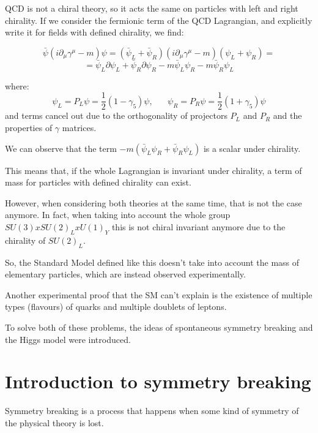 QCD is not a chiral theory, so it acts the same on particles with left and right chirality. 
If we consider the fermionic term of the QCD Lagrangian, and explicitly write it for fields with defined chirality, we find:

\begin{equation}
    \bar{\psi} (i\partial_{\mu}\gamma^{\mu}  - m ) \psi =  (\bar{\psi}_L + \bar{\psi}_R) (i\partial_{\mu}\gamma^{\mu}  - m ) (\psi_L + \psi_R) =
\end{equation}
\begin{equation*}
    = \bar{\psi}_L\partial\psi_L + \bar{\psi}_R\partial\psi_R - m\bar{\psi}_L\psi_R - m\bar{\psi}_R\psi_L
\end{equation*}

where:
\begin{equation*}
    \psi_L = P_L \psi = \frac{1}{2}(1- \gamma_5)\psi, \hspace{20pt} \psi_R = P_R\psi = \frac{1}{2}(1+ \gamma_5)\psi
\end{equation*}
and terms cancel out due to the orthogonality of projectors $P_L$ and $P_R$ and the properties of $\gamma$ matrices.

We can observe that the term $ - m(\bar{\psi}_L\psi_R + \bar{\psi}_R\psi_L)$ is a scalar under chirality.

This means that, if the whole Lagrangian is invariant under chirality, a term of mass for particles with defined chirality can exist.

However, when considering both theories at the same time, that is not the case anymore. In fact, when taking into account the whole group $SU(3)xSU(2)_LxU(1)_Y$ this is not chiral invariant anymore due to the chirality of $SU(2)_L$. 

So, the Standard Model defined like this doesn't take into account the mass of elementary particles, which are instead observed experimentally.

Another experimental proof that the SM can't explain is the existence of multiple types (flavours) of quarks and multiple doublets of leptons.

To solve both of these problems, the ideas of spontaneous symmetry breaking and the Higgs model were introduced.

\section{Introduction to symmetry breaking}

Symmetry breaking is a process that happens when some kind of symmetry of the physical theory is lost.

